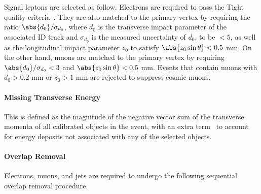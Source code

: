Signal leptons are selected as follow. Electrons are required to pass the Tight
quality criteria~\cite{PERF-2013-05,ATLAS-CONF-2016-024}. They are also matched
to the primary vertex by requiring the ratio $\abs{d_0} /\sigma_{d_0}$,
where $d_0$ is the transverse impact parameter of the associated ID track and
$\sigma_{d_0}$ is the measured uncertainty of $d_0$, to be $<5$, as well as the
longitudinal impact parameter $z_0$ to satisfy $\abs{z_0\sin\theta} < 0.5$ mm.
On the other hand, muons are matched to the primary vertex by requiring
$\abs{d_0} /\sigma_{d_0} < 3$ and $\abs{z_0\sin\theta} < 0.5$ mm. Events that
contain muons with $d_0 > 0.2$ mm or $z_0 > 1$ mm are rejected to suppress
cosmic muons.

\paragraph{Missing Transverse Energy} This is defined as the magnitude of the
negative vector sum of the transverse momenta of all calibrated objects in the
event, with an extra term~\cite{ATL-PHYS-PUB-2015-027,ATL-PHYS-PUB-2015-023} to
account for energy deposits not associated with any of the selected objects.


\paragraph{Overlap Removal} Electrons, muons, and jets are required to undergo
the following sequential overlap removal procedure.

